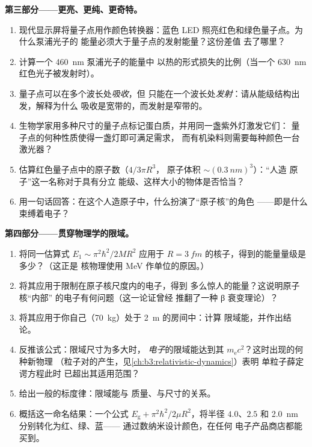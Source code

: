 \begin{problem}
\medskip\noindent\textbf{第三部分——更亮、更纯、更奇特。}
\begin{enumerate}[resume]
  \item 现代显示屏将量子点用作颜色转换器：蓝色 LED
        照亮红色和绿色量子点。为什么泵浦光子的
        能量必须大于量子点的发射能量？这份差值
        去了哪里？
  \item 计算一个 \qty{460}{nm} 泵浦光子的能量中
        以热的形式损失的比例（当一个 \qty{630}{nm} 红色光子被发射时）。
  \item 量子点可以在多个波长处\emph{吸收}，但
        只能在一个波长处\emph{发射}：请从能级结构出发，解释为什么
        吸收是宽带的，而发射是窄带的。
  \item 生物学家用多种尺寸的量子点标记蛋白质，并用同一盏紫外灯激发它们：
        量子点的何种性质使得一盏灯即可满足需求，
        而有机染料则需要每种颜色一台激光器？
  \item 估算红色量子点中的原子数（$4/3\pi R^3$，
        原子体积 $\sim(\qty{0.3}{nm})^3$）：“人造
        原子”这一名称对于具有分立
        能级、这样大小的物体是否恰当？
  \item 用一句话回答：在这个人造原子中，什么扮演了“原子核”的角色
        ——即是什么束缚着电子？
\end{enumerate}

\medskip\noindent\textbf{第四部分——贯穿物理学的限域。}
\begin{enumerate}[resume]
  \item 将同一估算式 $E_1 \sim \pi^2\hbar^2/2MR^2$ 应用于
        $R = \qty{3}{fm}$ 的核子，得到的能量量级是多少？（这正是
        核物理使用 MeV 作单位的原因。）
  \item 将其应用于限制在原子核尺度内的电子，得到
        多么惊人的能量？这说明原子核“内部”
        的电子有何问题（这一论证曾经
        推翻了一种 β 衰变理论）？
  \item 将其应用于你自己（\qty{70}{kg}）处于 \qty{2}{m} 的房间中：计算
        限域能，并作出结论。
  \item 反推该公式：限域尺寸为多大时，
        \emph{电子}的限域能达到其
        $m_{\text{e}}c^2$？这时出现的何种新物理
        （粒子对的产生，见\cref{ch:b3:relativistic-dynamics}）表明
        单粒子薛定谔方程此时
        已超出其适用范围？
  \item 给出一般的标度律：限域能与
        质量、与尺寸的关系。
  \item 概括这一命名结果：一个公式
        $E_{\text{g}} + \pi^2\hbar^2/2\mu R^2$，将半径
        $4.0$、$2.5$ 和 \qty{2.0}{nm} 分别转化为红、绿、蓝——
        通过数纳米设计颜色，在任何
        电子产品商店都能买到。
\end{enumerate}
\end{problem}
